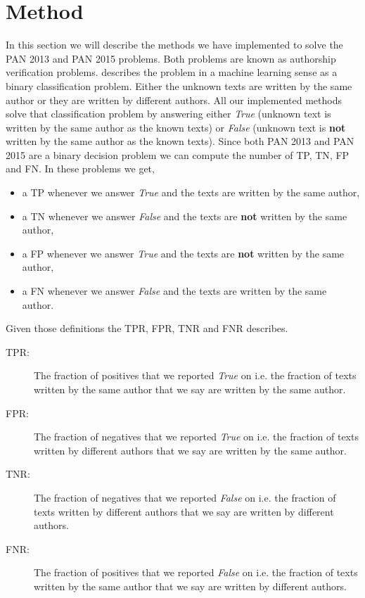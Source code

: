\section{Method} \label{sec:method} 

In this section we will describe the methods
we have implemented to solve the PAN 2013 and PAN 2015 problems. Both problems
are known as authorship verification problems. \cite{stamatos2009} describes
the problem in a machine learning sense as a binary classification problem.
Either the unknown texts are written by the same author or they are written by
different authors. All our implemented methods solve that classification problem
by answering either \textit{True} (unknown text is written by the same author as
the known texts) or \textit{False} (unknown text is \textbf{not} written by the
same author as the known texts). Since both PAN 2013 and PAN 2015 are a binary
decision problem we can compute the number of \gls{TP}, \gls{TN}, \gls{FP} and
\gls{FN}. In these problems we get,

\begin{itemize}
    \item a \gls{TP} whenever we answer \textit{True} and the texts are written
        by the same author,
    \item a \gls{TN} whenever we answer \textit{False} and the texts are
        \textbf{not} written by the same author,
    \item a \gls{FP} whenever we answer \textit{True} and the texts are
        \textbf{not} written by the same author,
    \item a \gls{FN} whenever we answer \textit{False} and the texts are written
        by the same author.
\end{itemize}

Given those definitions the \gls{TPR}, \gls{FPR}, \gls{TNR} and \gls{FNR}
describes.

\begin{description}
    \item[\gls{TPR}: ] The fraction of positives that we reported \textit{True}
        on i.e. the fraction of texts written by the same author that we say are
        written by the same author.
    \item[\gls{FPR}: ] The fraction of negatives that we reported \textit{True}
        on i.e. the fraction of texts written by different authors that we say
        are written by the same author.
    \item[\gls{TNR}: ] The fraction of negatives that we reported \textit{False}
        on i.e. the fraction of texts written by different authors that we say
        are written by different authors.
    \item[\gls{FNR}: ] The fraction of positives that we reported \textit{False}
        on i.e. the fraction of texts written by the same author that we say are
        written by different authors.
\end{description}

